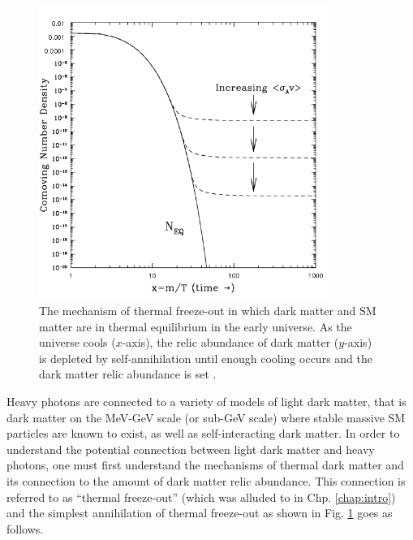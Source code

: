 \begin{figure}
    \centering
    \includegraphics[width=0.85\textwidth]{figs/motivation/thermalfreezeout.png}
    \caption{The mechanism of thermal freeze-out in which dark matter and SM matter are in thermal equilibrium in the early universe. As the universe cools ($x$-axis), the relic abundance of dark matter ($y$-axis) is depleted by self-annihilation until enough cooling occurs and the dark matter relic abundance is set \cite{Jungman_1996}.}
    \label{fig:freezeout}
\end{figure}

Heavy photons are connected to a variety of models of light dark matter, that is dark matter on the MeV-GeV scale (or sub-GeV scale) where stable massive SM particles are known to exist, as well as self-interacting dark matter. In order to understand the potential connection between light dark matter and heavy photons, one must first understand the mechanisms of thermal dark matter and its connection to the amount of dark matter relic abundance. This connection is referred to as ``thermal freeze-out'' (which was alluded to in Chp. \ref{chap:intro}) and the simplest annihilation of thermal freeze-out as shown in Fig. \ref{fig:freezeout} goes as follows.


